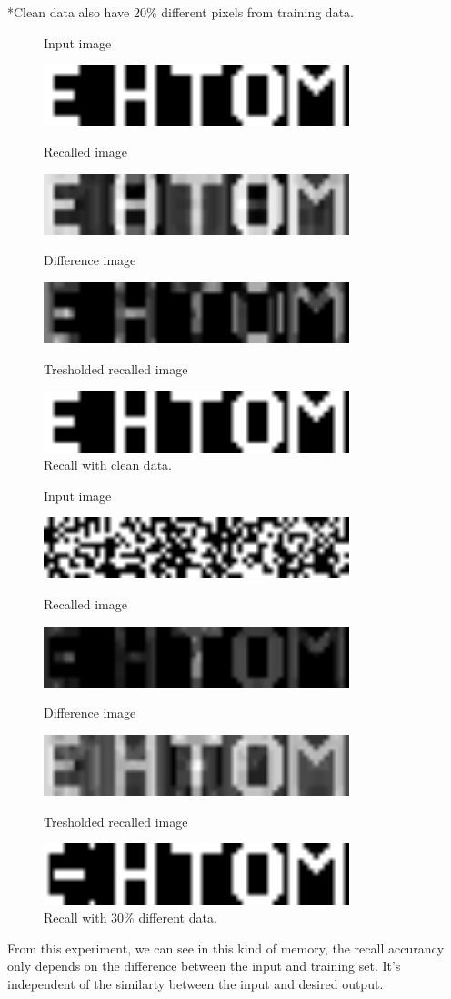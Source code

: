 \documentclass[epsfig]{article}
\def\npar{\vskip13pt}
\def\spar{\vskip10pt}
\begin{document}
*Clean data also have 20\% different pixels from training data.
\npar
\begin{figure}[H] 
	\centerline{Input image}
	\centering\includegraphics[width=3.5in]{oricha.png} 
	\centerline{Recalled image}
	\centering\includegraphics[width=3.5in]{p3d.png} 
	\centerline{Difference image}
	\centering\includegraphics[width=3.5in]{p3e.png}
	\centerline{Tresholded recalled image}
	\centering\includegraphics[width=3.5in]{oricha.png} 
	\caption{Recall with clean data.   }\label{fig:1} 
\end{figure} 
\begin{figure}[H] 
	\centerline{Input image}
	\centering\includegraphics[width=3.5in]{q3i.png} 
	\centerline{Recalled image}
	\centering\includegraphics[width=3.5in]{q3d.png} 
	\centerline{Difference image}
	\centering\includegraphics[width=3.5in]{q3e.png}
	\centerline{Tresholded recalled image}
	\centering\includegraphics[width=3.5in]{q3o.png} 
	\caption{Recall with 30\% different data.   }\label{fig:1} 
\end{figure} 
\spar
From this experiment, we can see in this kind of memory, the recall accurancy only depends on the difference between the input and training set. It's independent of the similarty between the input and desired output.
\end{document}
